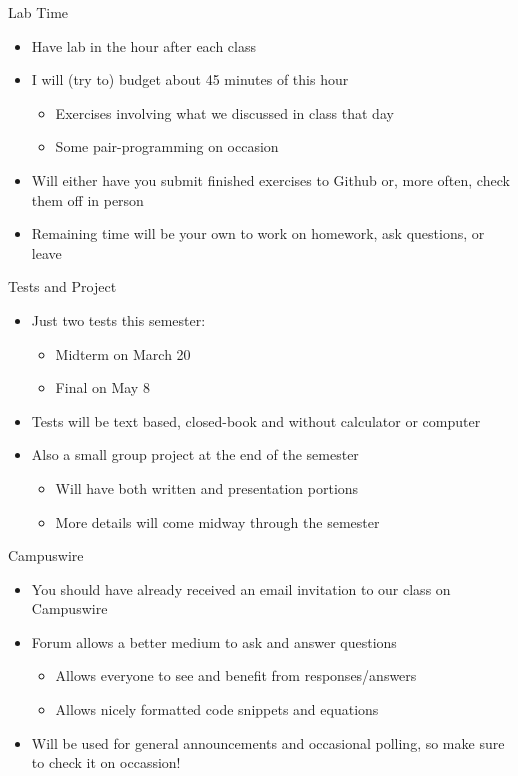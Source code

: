 \documentclass[pdf, aspectratio=169, 12pt]{beamer}
\begin{document}
\begin{frame}{Lab Time}
	\begin{itemize}
		\item Have lab in the hour after each class
		\item I will (try to) budget about 45 minutes of this hour
			\begin{itemize}
				\item Exercises involving what we discussed in class that day
				\item Some pair-programming on occasion
			\end{itemize}
		\item Will either have you submit finished exercises to Github or, more often, check them off in person
		\item Remaining time will be your own to work on homework, ask questions, or leave
	\end{itemize}
\end{frame}

\begin{frame}{Tests and Project}
	\begin{itemize}
		\item Just two tests this semester:
			\begin{itemize}
				\item Midterm on March 20
				\item Final on May 8
			\end{itemize}
		\item Tests will be text based, closed-book and without calculator or computer
		\item Also a small group project at the end of the semester
			\begin{itemize}
				\item Will have both written and presentation portions
				\item More details will come midway through the semester
			\end{itemize}
	\end{itemize}
\end{frame}

\begin{frame}{Campuswire}
	\begin{itemize}
		\item You should have already received an email invitation to our class on Campuswire
		\item Forum allows a better medium to ask and answer questions
			\begin{itemize}
				\item Allows everyone to see and benefit from responses/answers
				\item Allows nicely formatted code snippets and equations
			\end{itemize}
		\item Will be used for general announcements and occasional polling, so make sure to check it on occassion!
	\end{itemize}
\end{frame}
\end{document}
